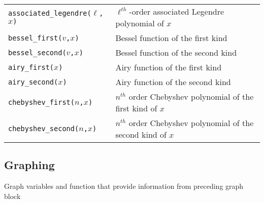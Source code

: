 \begin{supertabular}{ll}
{\tt associated\_legendre($\ell$,$x$)}      & $\ell^{th}$-order associated Legendre polynomial of $x$ \\
{\tt bessel\_first($v$,$x$)}      	   & Bessel function of the first kind \\
{\tt bessel\_second($v$,$x$)}         & Bessel function of the second kind \\
{\tt airy\_first($x$)}      	           & Airy function of the first kind \\
{\tt airy\_second($x$)}      	       & Airy function of the second kind \\
{\tt chebyshev\_first($n$,$x$)}       & $n^{th}$ order Chebyshev polynomial of the first kind of $x$  \\
{\tt chebyshev\_second($n$,$x$)}     & $n^{th}$ order Chebyshev polynomial of the second kind of $x$  \\
\end{supertabular}


\subsection{Graphing}

Graph variables and function that provide information from preceding graph block


